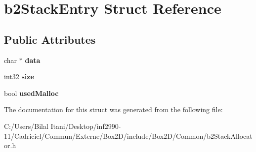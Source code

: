 \hypertarget{structb2_stack_entry}{}\section{b2\+Stack\+Entry Struct Reference}
\label{structb2_stack_entry}
\subsection*{Public Attributes}
\begin{DoxyCompactItemize}
\item 
char $\ast$ {\bfseries data}\hypertarget{structb2_stack_entry_af98aedeec2c20af0b7d3508a687ddd86}{}\label{structb2_stack_entry_af98aedeec2c20af0b7d3508a687ddd86}

\item 
int32 {\bfseries size}\hypertarget{structb2_stack_entry_a910c62f05317f8906224b2569e0cb344}{}\label{structb2_stack_entry_a910c62f05317f8906224b2569e0cb344}

\item 
bool {\bfseries used\+Malloc}\hypertarget{structb2_stack_entry_a581b5e4699bb66a28ec0727497a4e478}{}\label{structb2_stack_entry_a581b5e4699bb66a28ec0727497a4e478}

\end{DoxyCompactItemize}


The documentation for this struct was generated from the following file\+:\begin{DoxyCompactItemize}
\item 
C\+:/\+Users/\+Bilal Itani/\+Desktop/inf2990-\/11/\+Cadriciel/\+Commun/\+Externe/\+Box2\+D/include/\+Box2\+D/\+Common/b2\+Stack\+Allocator.\+h\end{DoxyCompactItemize}
